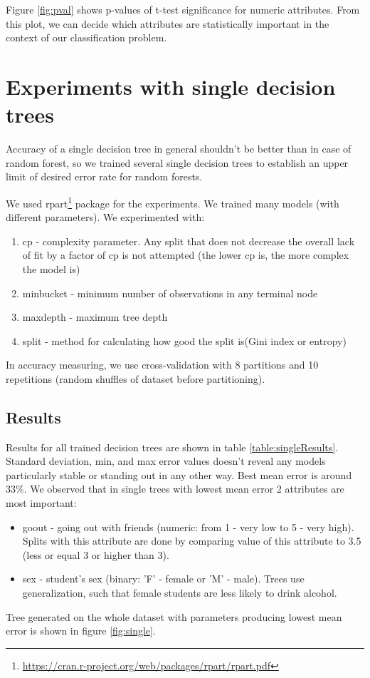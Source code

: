 \documentclass[a4paper]{article}
\begin{document}
Figure \ref{fig:pval} shows p-values of t-test significance for numeric attributes.
From this plot, we can decide which attributes are statistically important
in the context of our classification problem.



\section{Experiments with single decision trees}
\label{expSingle}

Accuracy of a single decision tree in general shouldn't be better than in case of random forest,
so we trained several single decision trees to establish
an upper limit of desired error rate for random forests.

We used rpart\footnote{\url{https://cran.r-project.org/web/packages/rpart/rpart.pdf}} package for the experiments.
We trained many models (with different parameters).
We experimented with:
\begin{enumerate}
    \item cp - complexity parameter.
        Any split that does not decrease the overall lack of fit by a factor of cp is not attempted
        (the lower cp is, the more complex the model is)
    \item minbucket - minimum number of observations in any terminal node
    \item maxdepth - maximum tree depth
    \item split - method for calculating how good the split is(Gini index or entropy)
\end{enumerate}
In accuracy measuring, we use cross-validation with 8 partitions
and 10 repetitions (random shuffles of dataset before partitioning).
% 
\subsection{Results}
\label{singleConc}

Results for all trained decision trees are shown in table \ref{table:singleResults}.
Standard deviation, min, and max error values doesn't reveal any models
particularly stable or standing out in any other way.
Best mean error is around 33\%.
We observed that in single trees with lowest mean error 2 attributes are most important:
\begin{itemize}
    \item goout - going out with friends (numeric: from 1 - very low to 5 - very high).
        Splits with this attribute are done by comparing value of this attribute to 3.5
        (less or equal 3 or higher than 3).
    \item sex - student's sex (binary: 'F' - female or 'M' - male).
        Trees use generalization, such that female students are less likely to drink alcohol.
\end{itemize}
Tree generated on the whole dataset with parameters producing lowest mean error is shown in figure \ref{fig:single}.
\end{document}
